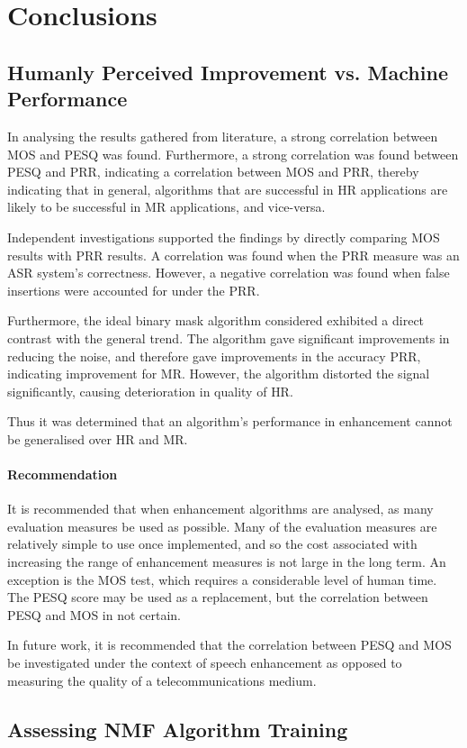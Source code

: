 
\chapter{Conclusions}

\acresetall


\section{Humanly Perceived Improvement vs. Machine Performance}

In analysing the results gathered from literature, a strong correlation
between \ac{MOS} and \ac{PESQ} was found. Furthermore, a strong
correlation was found between \ac{PESQ} and \ac{PRR}, indicating
a correlation between \ac{MOS} and \ac{PRR}, thereby indicating
that in general, algorithms that are successful in \ac{HR} applications
are likely to be successful in \ac{MR} applications, and vice-versa.

Independent investigations supported the findings by directly comparing
\ac{MOS} results with \ac{PRR} results. A correlation was found
when the \ac{PRR} measure was an \ac{ASR} system's correctness.
However, a negative correlation was found when false insertions were
accounted for under the \ac{PRR}.

Furthermore, the ideal binary mask algorithm considered exhibited
a direct contrast with the general trend. The algorithm gave significant
improvements in reducing the noise, and therefore gave improvements
in the accuracy \ac{PRR}, indicating improvement for \ac{MR}. However,
the algorithm distorted the signal significantly, causing deterioration
in quality of \ac{HR}.

Thus it was determined that an algorithm's performance in enhancement
cannot be generalised over \ac{HR} and \ac{MR}.


\subsubsection*{Recommendation}

It is recommended that when enhancement algorithms are analysed, as
many evaluation measures be used as possible. Many of the evaluation
measures are relatively simple to use once implemented, and so the
cost associated with increasing the range of enhancement measures
is not large in the long term. An exception is the \ac{MOS} test,
which requires a considerable level of human time. The \ac{PESQ}
score may be used as a replacement, but the correlation between \ac{PESQ}
and \ac{MOS} in not certain.

In future work, it is recommended that the correlation between \ac{PESQ}
and \ac{MOS} be investigated under the context of speech enhancement
as opposed to measuring the quality of a telecommunications medium.


\section{Assessing \acl{NMF} Algorithm Training}
